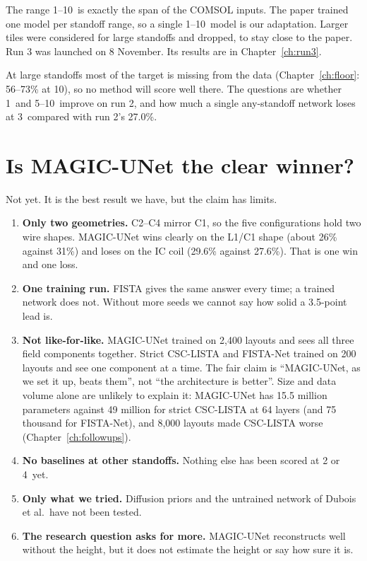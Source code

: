 The range 1--10\um\ is exactly the span of the COMSOL inputs. The paper trained one model per standoff range, so a single
1--10\um\ model is our adaptation. Larger tiles were considered for large standoffs and dropped, to stay close to the
paper. Run 3 was launched on 8 November. Its results are in Chapter~\ref{ch:run3}.

\begin{careful}
At large standoffs most of the target is missing from the data (Chapter~\ref{ch:floor}: 56--73\% at 10\um), so no method will
score well there. The questions are whether 1\um\ and 5--10\um\ improve on run 2, and how much a single any-standoff
network loses at 3\um\ compared with run 2's 27.0\%.
\end{careful}

\section{Is MAGIC-UNet the clear winner?}

Not yet. It is the best result we have, but the claim has limits.
\begin{enumerate}
\item \textbf{Only two geometries.} C2--C4 mirror C1, so the five configurations hold two wire shapes. MAGIC-UNet wins
clearly on the L1/C1 shape (about 26\% against 31\%) and loses on the IC coil (29.6\% against 27.6\%). That is one win and
one loss.
\item \textbf{One training run.} FISTA gives the same answer every time; a trained network does not. Without more seeds we
cannot say how solid a 3.5-point lead is.
\item \textbf{Not like-for-like.} MAGIC-UNet trained on 2,400 layouts and sees all three field components together.
Strict CSC-LISTA and FISTA-Net trained on 200 layouts and see one component at a time. The fair claim is ``MAGIC-UNet, as
we set it up, beats them'', not ``the architecture is better''. Size and data volume alone are unlikely to explain it:
MAGIC-UNet has 15.5 million parameters against 49 million for strict CSC-LISTA at 64 layers (and 75 thousand for
FISTA-Net), and 8,000 layouts made CSC-LISTA worse (Chapter~\ref{ch:followups}).
\item \textbf{No baselines at other standoffs.} Nothing else has been scored at 2 or 4\um\ yet.
\item \textbf{Only what we tried.} Diffusion priors and the untrained network of Dubois et al.\ have not been tested.
\item \textbf{The research question asks for more.} MAGIC-UNet reconstructs well without the height, but it does not
estimate the height or say how sure it is.
\end{enumerate}

